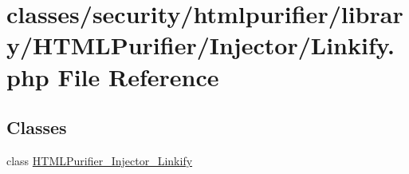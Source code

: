 \hypertarget{Linkify_8php}{\section{classes/security/htmlpurifier/library/\+H\+T\+M\+L\+Purifier/\+Injector/\+Linkify.php File Reference}
\label{Linkify_8php}
}
\subsection*{Classes}
\begin{DoxyCompactItemize}
\item 
class \hyperlink{classHTMLPurifier__Injector__Linkify}{H\+T\+M\+L\+Purifier\+\_\+\+Injector\+\_\+\+Linkify}
\end{DoxyCompactItemize}
